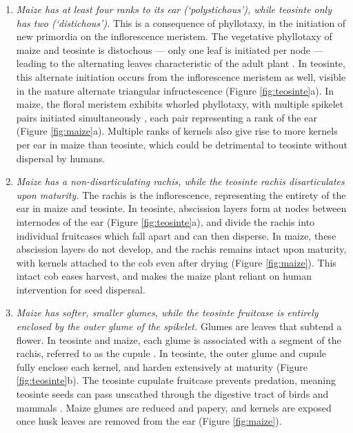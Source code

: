 \documentclass[9pt,twocolumn,twoside]{rilabRxiv}
\begin{document}
\begin{enumerate}
 \item \textit{Maize has at least four ranks to its ear (`polystichous'), while teosinte only has two (`distichous').}
 This is a consequence of phyllotaxy, in the initiation of new primordia on the inflorescence meristem.
 The vegetative phyllotaxy of maize and teosinte is distochous --- only one leaf is initiated per node --- leading to the alternating leaves characteristic of the adult plant \citep{jackson1999}.
  In teosinte, this alternate initiation occurs from the inflorescence meristem as well, visible in the mature alternate triangular infructescence \citep{sundberg1990} (Figure \ref{fig:teosinte}a).
 In maize, the floral meristem exhibits whorled phyllotaxy, with multiple spikelet pairs initiated simultaneously \citep{bartlett2014}, each pair representing a rank of the ear (Figure \ref{fig:maize}a).
 Multiple ranks of kernels also give rise to more kernels per ear in maize than teosinte, which could be detrimental to teosinte without dispersal by humans.

\item \textit{Maize has a non-disarticulating rachis, while the teosinte rachis disarticulates upon maturity.}
 The rachis is the inflorescence, representing the entirety of the ear in maize and teosinte.
 In teosinte, abscission layers form at nodes between internodes of the ear (Figure \ref{fig:teosinte}a), and divide the rachis into individual fruitcases which fall apart and can then disperse.
 In maize, these abscission layers do not develop, and the rachis remains intact upon maturity, with kernels attached to the cob even after drying \citep{iltis2000, chavez2012} (Figure \ref{fig:maize}).
 This intact cob eases harvest, and makes the maize plant reliant on human intervention for seed dispersal.

\item \textit{Maize has softer, smaller glumes, while the teosinte fruitcase is entirely enclosed by the outer glume of the spikelet.}
 Glumes are leaves that subtend a flower.
 In teosinte and maize, each glume is associated with a segment of the rachis, referred to as the cupule \citep{dorweiler1997}.
In teosinte, the outer glume and cupule fully enclose each kernel, and harden extensively at maturity (Figure \ref{fig:teosinte}b).
 The teosinte cupulate fruitcase prevents predation, meaning teosinte seeds can pass unscathed through the digestive tract of birds and mammals \citep{wilkes1967}.
 Maize glumes are reduced and papery, and kernels are exposed once husk leaves are removed from the ear (Figure \ref{fig:maize}).


\end{enumerate}
\end{document}
